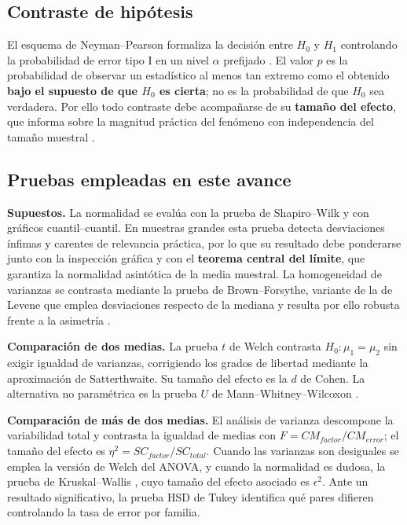 \documentclass[
]{book}
\begin{document}
\subsection{Contraste de hipótesis}\label{contraste-de-hipuxf3tesis}

El esquema de Neyman--Pearson formaliza la decisión entre \(H_0\) y \(H_1\) controlando la
probabilidad de error tipo I en un nivel \(\alpha\) prefijado \citep{fisher1925}. El valor \(p\) es la
probabilidad de observar un estadístico al menos tan extremo como el obtenido \textbf{bajo el
supuesto de que \(H_0\) es cierta}; no es la probabilidad de que \(H_0\) sea verdadera. Por ello
todo contraste debe acompañarse de su \textbf{tamaño del efecto}, que informa sobre la magnitud
práctica del fenómeno con independencia del tamaño muestral \citep{cohen1988}.

\subsection{Pruebas empleadas en este avance}\label{pruebas-empleadas-en-este-avance}

\textbf{Supuestos.} La normalidad se evalúa con la prueba de Shapiro--Wilk \citep{shapiro1965} y con
gráficos cuantil--cuantil. En muestras grandes esta prueba detecta desviaciones ínfimas y
carentes de relevancia práctica, por lo que su resultado debe ponderarse junto con la
inspección gráfica y con el \textbf{teorema central del límite}, que garantiza la normalidad
asintótica de la media muestral. La homogeneidad de varianzas se contrasta mediante la prueba
de Brown--Forsythe, variante de la de Levene que emplea desviaciones respecto de la mediana y
resulta por ello robusta frente a la asimetría \citep{brown1974}.

\textbf{Comparación de dos medias.} La prueba \(t\) de Welch \citep{welch1947} contrasta
\(H_0: \mu_1 = \mu_2\) sin exigir igualdad de varianzas, corrigiendo los grados de libertad
mediante la aproximación de Satterthwaite. Su tamaño del efecto es la \(d\) de Cohen. La
alternativa no paramétrica es la prueba \(U\) de Mann--Whitney--Wilcoxon \citep{mann1947}.

\textbf{Comparación de más de dos medias.} El análisis de varianza descompone la variabilidad total
y contrasta la igualdad de medias con \(F = CM_{factor}/CM_{error}\); el tamaño del efecto es
\(\eta^2 = SC_{factor}/SC_{total}\). Cuando las varianzas son desiguales se emplea la versión de
Welch del ANOVA, y cuando la normalidad es dudosa, la prueba de Kruskal--Wallis
\citep{kruskal1952}, cuyo tamaño del efecto asociado es \(\epsilon^2\). Ante un resultado
significativo, la prueba HSD de Tukey \citep{tukey1949} identifica qué pares difieren controlando
la tasa de error por familia.
\end{document}
